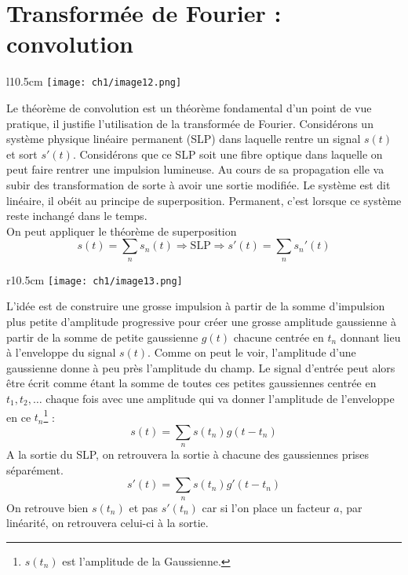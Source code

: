 \newpage
\section{Transformée de Fourier : convolution}
\begin{wrapfigure}[9]{l}{10.5cm}
\vspace{-6mm}
\texttt{[image: ch1/image12.png]}
\end{wrapfigure}
Le théorème de convolution est un théorème fondamental d'un point de vue pratique, il 
justifie l'utilisation de la transformée de Fourier. Considérons un système physique 
linéaire permanent (SLP) dans laquelle rentre un signal $s(t)$ et sort $s'(t)$. Considérons 
que ce SLP soit une fibre optique dans laquelle on peut faire rentrer une impulsion lumineuse. 
Au cours de sa propagation elle va subir des transformation de sorte à avoir une sortie modifiée.
Le système est dit linéaire, il obéit au principe de superposition. Permanent, c'est lorsque 
ce système reste inchangé dans le temps. \\

On peut appliquer le théorème de superposition
\begin{equation}
s(t) = \sum_n s_n(t) \Longrightarrow \text{SLP} \Longrightarrow s'(t) = \sum_n s_n'(t)
\end{equation}

\begin{wrapfigure}[7]{r}{10.5cm}
\vspace{-6mm}
\texttt{[image: ch1/image13.png]}
\end{wrapfigure}
L'idée est de construire une grosse impulsion à partir de la somme d'impulsion plus petite d'amplitude 
progressive pour créer une grosse amplitude gaussienne à partir de la somme de petite gaussienne 
$g(t)$ chacune centrée en $t_n$ donnant lieu à l'enveloppe du signal $s(t)$. Comme on peut le voir, 
l'amplitude d'une gaussienne donne à peu près l'amplitude du champ. Le signal d'entrée peut alors 
être écrit comme étant la somme de toutes ces petites gaussiennes centrée en $t_1,t_2,\dots$ chaque 
fois avec une amplitude qui va donner l'amplitude de l'enveloppe en ce $t_n$\footnote{$s(t_n)$ est 
l'amplitude de la Gaussienne.} :
\begin{equation}
s(t) = \sum_n s(t_n)g(t-t_n)
\end{equation}
A la sortie du SLP, on retrouvera la sortie à chacune des gaussiennes prises séparément.
\begin{equation}
s'(t) = \sum_n s(t_n)g'(t-t_n)
\end{equation}
\danger On retrouve bien $s(t_n)$ et pas $s'(t_n)$ car si l'on place un facteur $a$, par linéarité, 
on retrouvera celui-ci à la sortie.\\

